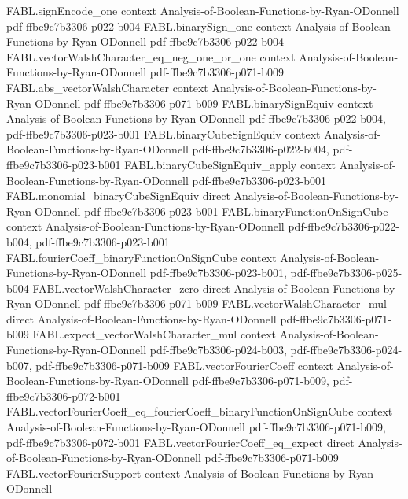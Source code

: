 \begin{theorem}
\proofstep
  {FABL.signEncode_one}
  {context}
  {Analysis-of-Boolean-Functions-by-Ryan-ODonnell}
  {pdf-ffbe9c7b3306-p022-b004}
\proofstep
  {FABL.binarySign_one}
  {context}
  {Analysis-of-Boolean-Functions-by-Ryan-ODonnell}
  {pdf-ffbe9c7b3306-p022-b004}
\proofstep
  {FABL.vectorWalshCharacter_eq_neg_one_or_one}
  {context}
  {Analysis-of-Boolean-Functions-by-Ryan-ODonnell}
  {pdf-ffbe9c7b3306-p071-b009}
\proofstep
  {FABL.abs_vectorWalshCharacter}
  {context}
  {Analysis-of-Boolean-Functions-by-Ryan-ODonnell}
  {pdf-ffbe9c7b3306-p071-b009}
\proofstep
  {FABL.binarySignEquiv}
  {context}
  {Analysis-of-Boolean-Functions-by-Ryan-ODonnell}
  {pdf-ffbe9c7b3306-p022-b004,
    pdf-ffbe9c7b3306-p023-b001}
\proofstep
  {FABL.binaryCubeSignEquiv}
  {context}
  {Analysis-of-Boolean-Functions-by-Ryan-ODonnell}
  {pdf-ffbe9c7b3306-p022-b004,
    pdf-ffbe9c7b3306-p023-b001}
\proofstep
  {FABL.binaryCubeSignEquiv_apply}
  {context}
  {Analysis-of-Boolean-Functions-by-Ryan-ODonnell}
  {pdf-ffbe9c7b3306-p023-b001}
\proofstep
  {FABL.monomial_binaryCubeSignEquiv}
  {direct}
  {Analysis-of-Boolean-Functions-by-Ryan-ODonnell}
  {pdf-ffbe9c7b3306-p023-b001}
\proofstep
  {FABL.binaryFunctionOnSignCube}
  {context}
  {Analysis-of-Boolean-Functions-by-Ryan-ODonnell}
  {pdf-ffbe9c7b3306-p022-b004,
    pdf-ffbe9c7b3306-p023-b001}
\proofstep
  {FABL.fourierCoeff_binaryFunctionOnSignCube}
  {context}
  {Analysis-of-Boolean-Functions-by-Ryan-ODonnell}
  {pdf-ffbe9c7b3306-p023-b001,
    pdf-ffbe9c7b3306-p025-b004}
\proofstep
  {FABL.vectorWalshCharacter_zero}
  {direct}
  {Analysis-of-Boolean-Functions-by-Ryan-ODonnell}
  {pdf-ffbe9c7b3306-p071-b009}
\proofstep
  {FABL.vectorWalshCharacter_mul}
  {direct}
  {Analysis-of-Boolean-Functions-by-Ryan-ODonnell}
  {pdf-ffbe9c7b3306-p071-b009}
\proofstep
  {FABL.expect_vectorWalshCharacter_mul}
  {context}
  {Analysis-of-Boolean-Functions-by-Ryan-ODonnell}
  {pdf-ffbe9c7b3306-p024-b003,
    pdf-ffbe9c7b3306-p024-b007,
    pdf-ffbe9c7b3306-p071-b009}
\proofstep
  {FABL.vectorFourierCoeff}
  {context}
  {Analysis-of-Boolean-Functions-by-Ryan-ODonnell}
  {pdf-ffbe9c7b3306-p071-b009,
    pdf-ffbe9c7b3306-p072-b001}
\proofstep
  {FABL.vectorFourierCoeff_eq_fourierCoeff_binaryFunctionOnSignCube}
  {context}
  {Analysis-of-Boolean-Functions-by-Ryan-ODonnell}
  {pdf-ffbe9c7b3306-p071-b009,
    pdf-ffbe9c7b3306-p072-b001}
\proofstep
  {FABL.vectorFourierCoeff_eq_expect}
  {direct}
  {Analysis-of-Boolean-Functions-by-Ryan-ODonnell}
  {pdf-ffbe9c7b3306-p071-b009}
\proofstep
  {FABL.vectorFourierSupport}
  {context}
  {Analysis-of-Boolean-Functions-by-Ryan-ODonnell}

\end{theorem}
